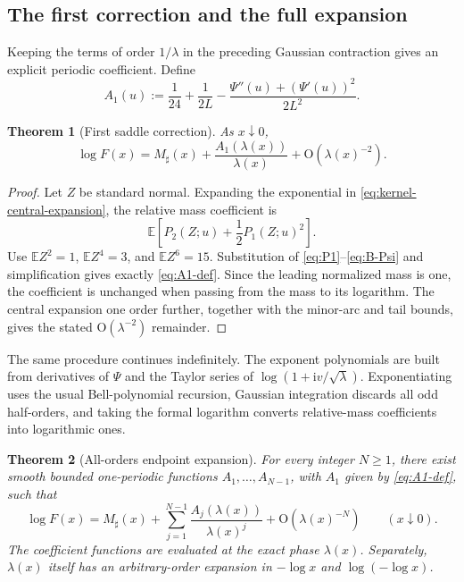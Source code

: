 \documentclass[11pt]{article}
\numberwithin{equation}{section}
\newtheorem{theorem}{Theorem}[section]
\theoremstyle{definition}
\theoremstyle{remark}
\newcommand{\ii}{\mathrm i}
\newcommand{\Oh}{\mathrm O}
\begin{document}
\subsection{The first correction and the full expansion}

Keeping the terms of order $1/\lambda$ in the preceding Gaussian contraction
gives an explicit periodic coefficient.  Define
\begin{equation}\label{eq:A1-def}
\boxed{
 A_1(u):=\frac1{24}+\frac1{2L}
 -\frac{\Psi''(u)+(\Psi'(u))^2}{2L^2}.}
\end{equation}

\begin{theorem}[First saddle correction]\label{thm:first-correction}
As $x\downarrow0$,
\begin{equation}\label{eq:first-correction}
 \log F(x)=M_\sharp(x)
 +\frac{A_1(\lambda(x))}{\lambda(x)}
 +\Oh(\lambda(x)^{-2}).
\end{equation}
\end{theorem}

\begin{proof}
Let $Z$ be standard normal.  Expanding the exponential in
\eqref{eq:kernel-central-expansion}, the relative mass coefficient is
\begin{equation}\label{eq:gaussian-contraction}
 \mathbb E\left[P_2(Z;u)+\frac12P_1(Z;u)^2\right].
\end{equation}
Use
$\mathbb EZ^2=1$, $\mathbb EZ^4=3$, and $\mathbb EZ^6=15$.
Substitution of \eqref{eq:P1}--\eqref{eq:B-Psi} and simplification gives
exactly \eqref{eq:A1-def}.  Since the leading normalized mass is one, the
coefficient is unchanged when passing from the mass to its logarithm.  The
central expansion one order further, together with the minor-arc and tail
bounds, gives the stated $\Oh(\lambda^{-2})$ remainder.
\end{proof}

The same procedure continues indefinitely.  The exponent polynomials are
built from derivatives of $\Psi$ and the Taylor series of
$\log(1+\ii v/\sqrt\lambda)$.  Exponentiating uses the usual Bell-polynomial
recursion, Gaussian integration discards all odd half-orders, and taking the
formal logarithm converts relative-mass coefficients into logarithmic ones.

\begin{theorem}[All-orders endpoint expansion]\label{thm:all-orders}
For every integer $N\ge1$, there exist smooth bounded one-periodic functions
$A_1,\ldots,A_{N-1}$, with $A_1$ given by \eqref{eq:A1-def}, such that
\begin{equation}\label{eq:all-orders}
\boxed{
 \log F(x)=M_\sharp(x)
 +\sum_{j=1}^{N-1}\frac{A_j(\lambda(x))}{\lambda(x)^j}
 +\Oh(\lambda(x)^{-N})
 \qquad(x\downarrow0).}
\end{equation}
The coefficient functions are evaluated at the exact phase $\lambda(x)$.
Separately, $\lambda(x)$ itself has an arbitrary-order expansion in
$-\log x$ and $\log(-\log x)$.
\end{theorem}
\end{document}
